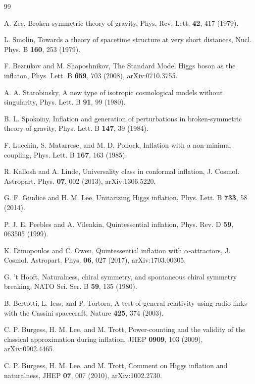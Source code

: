 \documentclass[pdflatex,sn-mathphys-num]{sn-jnl}
\theoremstyle{thmstyleone}
\begin{document}
\begin{thebibliography}{99}

 A. Zee, Broken-symmetric theory of gravity, Phys. Rev. Lett. \textbf{42}, 417 (1979).

 L. Smolin, Towards a theory of spacetime structure at very short distances, Nucl. Phys. B \textbf{160}, 253 (1979).

 F. Bezrukov and M. Shaposhnikov, The Standard Model Higgs boson as the inflaton, Phys. Lett. B \textbf{659}, 703 (2008), arXiv:0710.3755.

 A. A. Starobinsky, A new type of isotropic cosmological models without singularity, Phys. Lett. B \textbf{91}, 99 (1980).

 B. L. Spokoiny, Inflation and generation of perturbations in broken-symmetric theory of gravity, Phys. Lett. B \textbf{147}, 39 (1984).

 F. Lucchin, S. Matarrese, and M. D. Pollock, Inflation with a non-minimal coupling, Phys. Lett. B \textbf{167}, 163 (1985).

 R. Kallosh and A. Linde, Universality class in conformal inflation, J. Cosmol. Astropart. Phys. \textbf{07}, 002 (2013), arXiv:1306.5220.

 G. F. Giudice and H. M. Lee, Unitarizing Higgs inflation, Phys. Lett. B \textbf{733}, 58 (2014).

 P. J. E. Peebles and A. Vilenkin, Quintessential inflation, Phys. Rev. D \textbf{59}, 063505 (1999).

 K. Dimopoulos and C. Owen, Quintessential inflation with $\alpha$-attractors, J. Cosmol. Astropart. Phys. \textbf{06}, 027 (2017), arXiv:1703.00305.

 G. 't Hooft, Naturalness, chiral symmetry, and spontaneous chiral symmetry breaking, NATO Sci. Ser. B \textbf{59}, 135 (1980).

 B. Bertotti, L. Iess, and P. Tortora, A test of general relativity using radio links with the Cassini spacecraft, Nature \textbf{425}, 374 (2003).

 C. P. Burgess, H. M. Lee, and M. Trott, Power-counting and the validity of the classical approximation during inflation, JHEP \textbf{0909}, 103 (2009), arXiv:0902.4465.

 C. P. Burgess, H. M. Lee, and M. Trott, Comment on Higgs inflation and naturalness, JHEP \textbf{07}, 007 (2010), arXiv:1002.2730.


\end{thebibliography}
\end{document}
